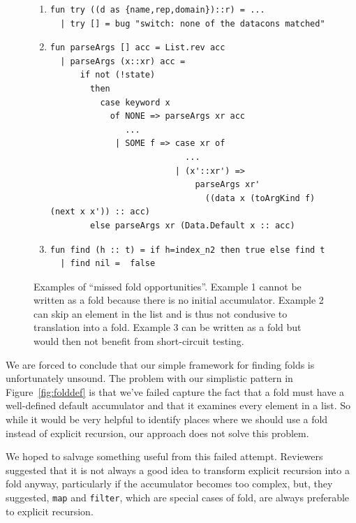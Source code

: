 \documentclass[12pt,abstracton]{scrartcl}
\begin{document}
\begin{figure}
\begin{enumerate}
\item
\begin{verbatim}
fun try ((d as {name,rep,domain})::r) = ...
  | try [] = bug "switch: none of the datacons matched"
\end{verbatim}
\item
\begin{verbatim}
fun parseArgs [] acc = List.rev acc
  | parseArgs (x::xr) acc =
      if not (!state)
        then
          case keyword x
            of NONE => parseArgs xr acc
               ...
             | SOME f => case xr of
                           ...
                         | (x'::xr') =>
                             parseArgs xr'
                               ((data x (toArgKind f) (next x x')) :: acc)
        else parseArgs xr (Data.Default x :: acc)
\end{verbatim}
\item
\begin{verbatim}
fun find (h :: t) = if h=index_n2 then true else find t
  | find nil =  false
\end{verbatim}
\end{enumerate}
\caption{Examples of ``missed fold opportunities''. Example 1 cannot be written as a fold
because there is no initial accumulator.
Example 2 can skip an element in the list
and is thus not condusive to translation into a fold. Example 3
can be written as a fold but would then not benefit from short-circuit testing.}
\label{fig:fold}
\end{figure}

We are forced to conclude that our simple framework for finding folds
is unfortunately unsound.
The problem with our simplistic pattern in Figure~\ref{fig:folddef}
is that we've failed capture the fact that a fold must have a well-defined
default accumulator and that it examines every element in a list.
So while it would be very helpful to identify places where we should
use a fold instead of explicit recursion, our approach does
not solve this problem.

We hoped to salvage something useful from this failed attempt.
Reviewers suggested that it is not always a good idea to transform
explicit recursion into a fold anyway, particularly if the accumulator becomes
too complex, but, they suggested, \texttt{map} and \texttt{filter}, which are
special cases of fold, are always preferable to explicit recursion.
\end{document}

